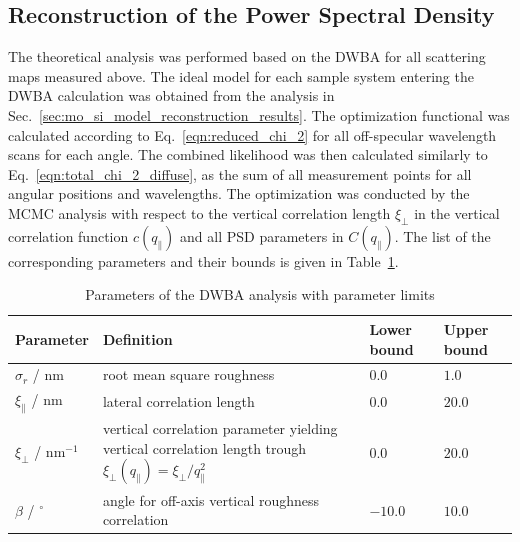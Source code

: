 \subsection{Reconstruction of the Power Spectral Density}
The theoretical analysis was performed based on the DWBA for all scattering maps measured above. The ideal model for each sample system entering the DWBA calculation was obtained from the analysis in Sec.~\ref{sec:mo_si_model_reconstruction_results}. The optimization functional was calculated according to Eq.~\eqref{eqn:reduced_chi_2} for all off-specular wavelength scans for each angle. The combined likelihood was then calculated similarly to Eq.~\eqref{eqn:total_chi_2_diffuse}, as the sum of all measurement points for all angular positions and wavelengths. The optimization was conducted by the MCMC analysis with respect to the vertical correlation length $\xi_\perp$ in the vertical correlation function $c(q_\parallel)$ and all PSD parameters in $C(q_\parallel)$. The list of the corresponding parameters and their bounds is given in Table~\ref{tbl:diffuse_parameters}.
\begin{table}
\centering
\caption{Parameters of the DWBA analysis with parameter limits}
\label{tbl:diffuse_parameters}
\begin{tabularx}{\textwidth}{@{}lXll@{}}
\toprule
Parameter & Definition & Lower bound & Upper bound\\ \midrule
$\sigma_r$ / nm & root mean square roughness & $0.0$& $1.0$\\ 
$\xi_\parallel$ / nm & lateral correlation length & $0.0$& $20.0$\\ 
$\xi_\perp$ / nm$^{-1}$ &vertical correlation parameter yielding vertical correlation length trough $\xi_\perp(q_\parallel) = \xi_\perp/q_\parallel^2$ &$0.0$ & $20.0$\\
$\beta$ / $^\circ$&angle for off-axis vertical roughness correlation& $-10.0$ & $10.0$\\ 
 \bottomrule
\end{tabularx}
\end{table}

